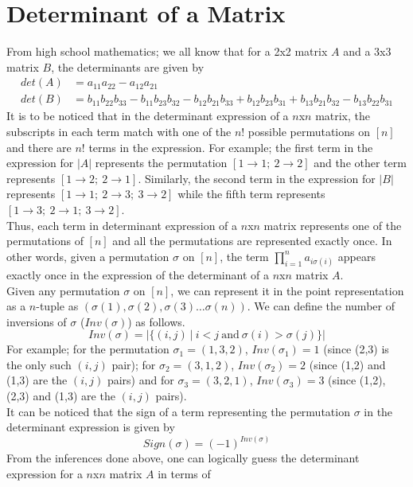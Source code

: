 \section{Determinant of a Matrix}\label{sec:determinant of a matrix}
From high school mathematics; we all know that for a 2x2 matrix $A$ and a 3x3 matrix $B$, the determinants are given by 
\begin{align*}
  det(A) &= a_{11}a_{22}-a_{12}a_{21}\\
  det(B) &= b_{11}b_{22}b_{33}-b_{11}b_{23}b_{32}-b_{12}b_{21}b_{33}+b_{12}b_{23}b_{31}+b_{13}b_{21}b_{32}-b_{13}b_{22}b_{31}
\end{align*}
It is to be noticed that in the determinant expression of a $n$x$n$ matrix, the subscripts in each term match with one of the $n!$ possible permutations on $[n]$ and there are $n!$ terms in the expression. For example; the first term in the expression for $|A|$ represents the permutation $[1\rightarrow1; ~2\rightarrow2]$ and the other term represents $[1\rightarrow2; ~2\rightarrow1]$. Similarly, the second term in the expression for $|B|$ represents $[1\rightarrow1; ~2\rightarrow3;~3\rightarrow2]$ while the fifth term represents $[1\rightarrow3; ~2\rightarrow1;~3\rightarrow2]$.\\
Thus, each term in determinant expression of a $n$x$n$ matrix represents one of the permutations of $[n]$ and all the permutations are represented exactly once. In other words, given a permutation $\sigma$ on $[n]$, the term $\prod_{i=1}^{n} a_{i\sigma(i)}$ appears exactly once in the expression of the determinant of a $n$x$n$ matrix $A$.\\
Given any permutation $\sigma$ on $[n]$, we can represent it in the point representation as a $n$-tuple as $(\sigma(1),\sigma(2),\sigma(3)\ldots \sigma(n))$. We can define the number of inversions of $\sigma$ ($Inv(\sigma)$) as follows.
$$Inv(\sigma) = |\{(i,j)~|~i<j~\text{and}~\sigma(i)>\sigma(j)\}|$$
For example; for the permutation $\sigma_1 = (1,3,2)$, $Inv(\sigma_1) = 1$ (since (2,3) is the only such $(i,j)$ pair); for $\sigma_2 = (3,1,2)$, $Inv(\sigma_2) = 2$ (since (1,2) and (1,3) are the $(i,j)$ pairs) and for $\sigma_3 = (3,2,1)$, $Inv(\sigma_3) = 3$ (since (1,2), (2,3) and (1,3) are the $(i,j)$ pairs). \\
It can be noticed that the sign of a term representing the permutation $\sigma$ in the determinant expression is given by
$$Sign(\sigma) = (-1)^{Inv(\sigma)}$$
From the inferences done above, one can logically guess the determinant expression for a $n$x$n$ matrix $A$ in terms of
